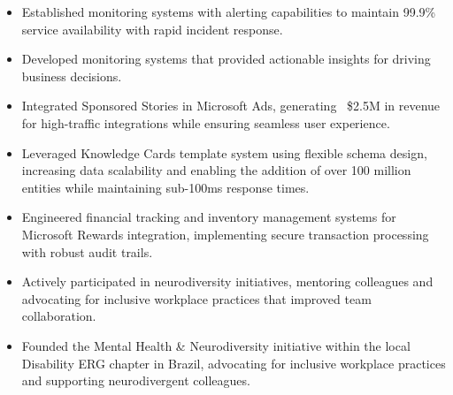 \begin{itemize}
    \item \scriptsize{Established monitoring systems with alerting capabilities to maintain 99.9\% service availability with rapid incident response.}

    \item \scriptsize{Developed monitoring systems that provided actionable insights for driving business decisions.}

    \item \scriptsize{Integrated Sponsored Stories in Microsoft Ads, generating ~\$2.5M in revenue for high-traffic integrations while ensuring seamless user experience.}

    \item \scriptsize{Leveraged Knowledge Cards template system using flexible schema design, increasing data scalability and enabling the addition of over 100 million entities while maintaining sub-100ms response times.}

    \item \scriptsize{Engineered financial tracking and inventory management systems for Microsoft Rewards integration, implementing secure transaction processing with robust audit trails.}

    \item \scriptsize{Actively participated in neurodiversity initiatives, mentoring colleagues and advocating for inclusive workplace practices that improved team collaboration.}
    
    \item \scriptsize{Founded the Mental Health \& Neurodiversity initiative within the local Disability ERG chapter in Brazil, advocating for inclusive workplace practices and supporting neurodivergent colleagues.}
\end{itemize}